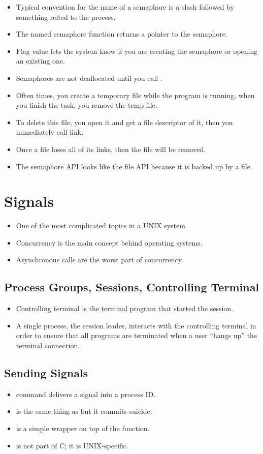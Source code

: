 \documentclass[]{article}
\begin{document}
\begin{itemize}
\item Typical convention for the name of a semaphore is a slash followed by
something relted to the process.
\item The named semaphore function  returns a pointer to the
semaphore.
\item Flag value lets the system know if you are creating the semaphore or
opening an existing one.
\item Semaphores are not deallocated until you call .
\item Often times, you create a temporary file while the program is running,
when you finish the task, you remove the temp file.
\item To delete this file, you open it and get a file descriptor of it, then you
immediately call link.
\item Once a file loses all of its links, then the file will be removed.
\item The semaphore API looks like the file API because it is backed up by a
file.
\end{itemize}

\section{Signals}
\begin{itemize}
\item One of the most complicated topics in a UNIX system.
\item Concurrency is the main concept behind operating systems.
\item Asynchronous calls are the worst part of concurrency.
\end{itemize}

\subsection{Process Groups, Sessions, Controlling Terminal}
\begin{itemize}
\item Controlling terminal is the terminal program that started the session.
\item A single process, the session leader, interacts with the controlling
terminal in order to ensure that all programs are terminated when a user ``hangs
up'' the terminal connection.
\end{itemize}

\subsection{Sending Signals}
\begin{itemize}
\item {} command delivers a signal into a process ID.
\item {} is the same thing as  but it commits suicide.
\item {} is a simple wrapper on top of the  function.
\item {} is not part of C; it is UNIX-specific.
\end{itemize}
\end{document}
